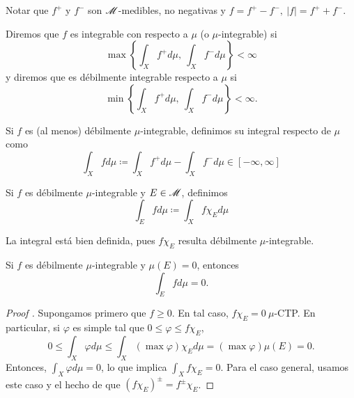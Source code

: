 \begin{remark}
	Notar que $f^{+}$ y $f^{-}$ son $\mathscr{M}$-medibles, no negativas y $f = f^{+} - f^{-}, \ |f| = f^{+} + f^{-}$.
\end{remark}

\begin{definition}
	Diremos que $f$ es integrable con respecto a $\mu$ (o $\mu$-integrable) si
	\[ \max \left\{\int_{X} f^{+} d\mu,\ \int_{X} f^{-} d\mu\right\} < \infty \]
	y diremos que es débilmente integrable respecto a $\mu$ si
	\[ \min \left\{\int_{X} f^{+} d\mu,\ \int_{X} f^{-} d\mu\right\} < \infty. \]
\end{definition}

\begin{definition}
	Si $f$ es (al menos) débilmente $\mu$-integrable, definimos su integral respecto de $\mu$ como
	\[ \int_{X} f d\mu \coloneq \int_{X} f^{+} d\mu - \int_{X} f^{-} d\mu \in [-\infty,\infty] \]
\end{definition}

\begin{definition}
	Si $f$ es débilmente $\mu$-integrable y $E \in \mathscr{M}$, definimos
	\[ \int_{E} f d\mu \coloneq \int_{X} f \chi_{E} d\mu \]
\end{definition}

\begin{remark}
	La integral está bien definida, pues $f \chi_{E}$ resulta débilmente $\mu$-integrable.
\end{remark}

\begin{lemma}
	Si $f$ es débilmente $\mu$-integrable y $\mu(E) = 0$, entonces
	\[ \int_{E} f d\mu = 0. \]
\end{lemma}
\begin{proof}[Proof ]
	Supongamos primero que $f \geq 0$. En tal caso, $f \chi_{E} = 0 \ \mu$-CTP. En particular, si $\varphi$ es simple tal que $0 \leq \varphi \leq f \chi_{E}$,
	\[ 0 \leq \int_{X} \varphi d\mu \leq \int_{X} (\max \varphi) \chi_{E} d\mu = (\max \varphi) \mu(E) = 0. \]
	Entonces, $\int_{X} \varphi d\mu = 0$, lo que implica $\int_{X} f \chi_{E} = 0$. Para el caso general, usamos este caso y el hecho de que $(f \chi_{E})^{\pm} = f^{\pm} \chi_{E}$.
\end{proof}
